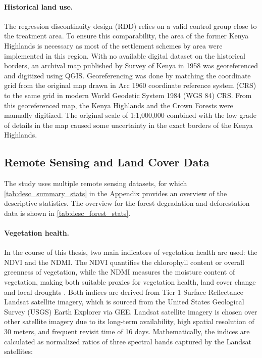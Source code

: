 \paragraph{Historical land use.}
The regression discontinuity design (RDD) relies on a valid control group close to the treatment area.
To ensure this comparability, the area of the former Kenya Highlands is necessary as most of the settlement schemes by area were implemented in this region.
With no available digital dataset on the historical borders, an archival map published by Survey of Kenya in 1958 was georeferenced and digitized using QGIS.
Georeferencing was done by matching the coordinate grid from the original map drawn in Arc 1960 coordinate reference system (CRS) to the same grid in modern World Geodetic System 1984 (WGS 84) CRS.
From this georeferenced map, the Kenya Highlands and the Crown Forests were manually digitized.
The original scale of 1:1,000,000 combined with the low grade of details in the map caused some uncertainty in the exact borders of the Kenya Highlands.


\subsection{Remote Sensing and Land Cover Data}

The study uses multiple remote sensing datasets, for which \cref{tab:desc_summary_stats} in the Appendix provides an overview of the descriptive statistics.
The overview for the forest degradation and deforestation data is shown in \cref{tab:desc_forest_stats}.

\paragraph{Vegetation health.}
In the course of this thesis, two main indicators of vegetation health are used: the NDVI and the NDMI.
The NDVI quantifies the chlorophyll content or overall greenness of vegetation, while the NDMI measures the moisture content of vegetation,
making both suitable proxies for vegetation health, land cover change and local droughts \parencite{pettorelliUsingSatellitederivedNDVI2005,khanAssessingImpactLand2025}.
Both indices are derived from Tier 1 Surface Reflectance Landsat satellite imagery, which is sourced from the United States Geological Survey (USGS) Earth Explorer via GEE.
Landsat satellite imagery is chosen over other satellite imagery due to its long-term availability, high spatial resolution of 30 meters, and frequent revisit time of 16 days.
Mathematically, the indices are calculated as normalized ratios of three spectral bands captured by the Landsat satellites:


